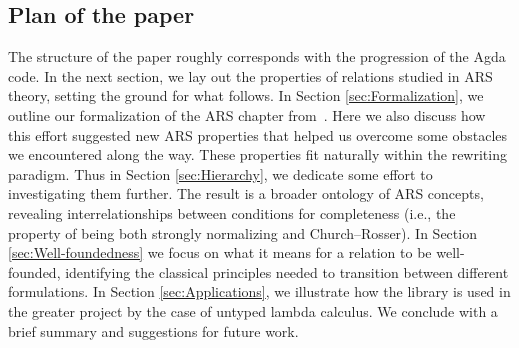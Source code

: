
\subsection{Plan of the paper}

The structure of the paper roughly corresponds with the progression of the Agda code.
In the next section, we lay out the properties of relations studied in ARS theory,
setting the ground for what follows.  In Section \ref{sec:Formalization}, we
outline our formalization of the ARS chapter from~\cite{Terese}.
Here we also discuss how this effort suggested new ARS properties that helped us overcome some obstacles we encountered along the way.  These properties fit naturally within the rewriting paradigm.  Thus in Section \ref{sec:Hierarchy}, we dedicate some effort to investigating them further.  The result is a broader ontology of ARS concepts, revealing interrelationships between conditions for completeness (i.e., the property of being both strongly normalizing and Church--Rosser).  In Section \ref{sec:Well-foundedness} we focus on what it means for a relation to be well-founded, identifying the classical principles needed to transition between different formulations.
In Section \ref{sec:Applications}, we illustrate how the library is used in the greater project by the case of untyped lambda calculus.
We conclude with a brief summary and suggestions for future work.

